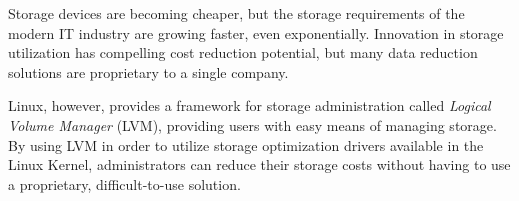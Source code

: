 \documentclass[
  color, %
  table, %
  lof,   %
  lot,   %
]{fithesis3}
\begin{document}









\newcommand{\fio}{\texttt{fio}}
\newcommand{\fsdrift}{\texttt{fs-drift}}



Storage devices are becoming cheaper, but the storage requirements of the modern IT industry are growing faster, even exponentially. Innovation in storage utilization has compelling cost reduction potential, but many data reduction solutions are proprietary to a single company.

Linux, however, provides a framework for storage administration called \emph{Logical Volume Manager} (LVM), providing users with easy means of managing storage. By using LVM in order to utilize storage optimization drivers available in the Linux Kernel, administrators can reduce their storage costs without having to use a proprietary, difficult-to-use solution.
\end{document}
